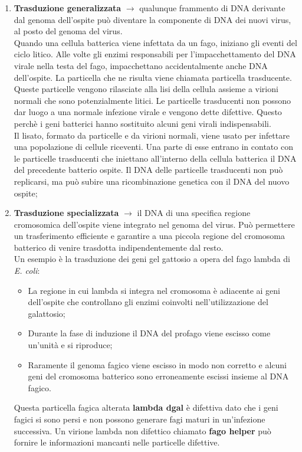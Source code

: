 \begin{enumerate}
    \item \textbf{Trasduzione generalizzata} $\xrightarrow{}$ qualunque frammento di DNA derivante dal genoma dell'ospite può diventare la componente di DNA dei nuovi virus, al posto del genoma del virus. 
    \\Quando una cellula batterica viene infettata da un fago, iniziano gli eventi del ciclo litico. Alle volte gli enzimi responsabili per l’impacchettamento del DNA virale nella testa del fago, impacchettano accidentalmente anche DNA dell’ospite. La particella che ne risulta viene chiamata particella trasducente. Queste particelle vengono rilasciate alla lisi della cellula assieme a virioni normali che sono potenzialmente litici. Le particelle trasducenti non possono dar luogo a una normale infezione virale e vengono dette difettive. Questo perchè i geni batterici hanno sostituito alcuni geni virali indispensabili. 
    \\Il lisato, formato da particelle e da virioni normali, viene usato per infettare una popolazione di cellule riceventi. Una parte di esse entrano in contato con le particelle trasducenti che iniettano all'interno della cellula batterica il DNA del precedente batterio ospite. Il DNA delle particelle trasducenti non può replicarsi, ma può subire una ricombinazione genetica con il DNA del nuovo ospite; 
    \item \textbf{Trasduzione specializzata} $\xrightarrow{}$ il DNA di una specifica regione cromosomica dell'ospite viene integrato nel genoma del virus. Può permettere un trasferimento efficiente e garantire a una piccola regione del cromosoma batterico di venire trasdotta indipendentemente dal resto. 
    \\Un esempio è la trasduzione dei geni gel gattosio a opera del fago lambda di \textit{E. coli}:
    \begin{itemize}
        \item La regione in cui lambda si integra nel cromosoma è adiacente ai geni dell'ospite che controllano gli enzimi coinvolti nell'utilizzazione del galattosio;
        \item Durante la fase di induzione il DNA del profago viene escisso come un'unità e si riproduce;
        \item Raramente il genoma fagico viene escisso in modo non corretto e alcuni geni del cromosoma batterico sono erroneamente escissi insieme al DNA fagico. 
    \end{itemize}
    Questa particella fagica alterata \textbf{lambda dgal} è difettiva dato che i geni fagici si sono persi e non possono generare fagi maturi in un'infezione successiva. Un virione lambda non difettico chiamato \textbf{fago helper} può fornire le informazioni mancanti nelle particelle difettive.

\end{enumerate}

